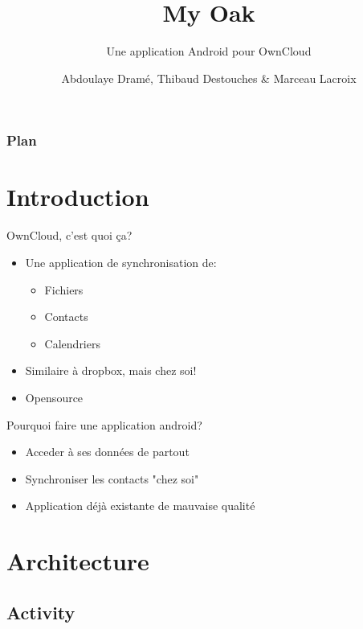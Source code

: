 \documentclass{beamer}
\title{My Oak}
\subtitle{Une application Android pour OwnCloud}
\author{Abdoulaye Dramé, Thibaud Destouches \& Marceau Lacroix}
\institute{ISTIC}
\date{}
\begin{document}
\begin{frame}
\titlepage
\end{frame}

\begin{frame}
\frametitle{Plan}
\tableofcontents
\end{frame}




\section{Introduction}

	\begin{frame}{OwnCloud, c'est quoi ça?}
	\begin{itemize}
	\item Une application de synchronisation de:
		\begin{itemize}
		\item Fichiers
		\item Contacts
		\item Calendriers
		\end{itemize}
	\item Similaire à dropbox, mais chez soi!
	\item Opensource
	\end{itemize}
	\end{frame}

	\begin{frame}{Pourquoi faire une application android?}
	\begin{itemize}
	\item Acceder à ses données de partout
	\pause
	\item Synchroniser les contacts "chez soi"
	\pause
	\item Application déjà existante de mauvaise qualité
	\end{itemize}
	\end{frame}

\section{Architecture}

	\subsection{Activity}

		\begin{frame}{}
		\begin{itemize}

		\end{itemize}
		\end{frame}
		\begin{frame}{}
		\begin{itemize}

		\end{itemize}
		\end{frame}
	
\end{document}
